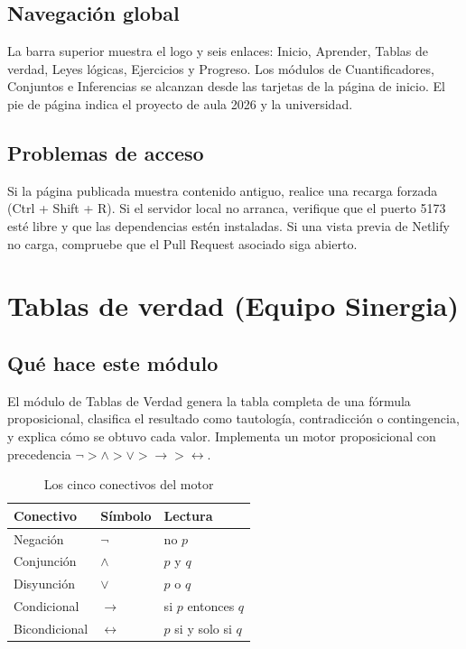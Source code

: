 \documentclass[11pt,a4paper,openany]{book}
\begin{document}
\section{Navegaci\'on global}
La barra superior muestra el logo y seis enlaces: Inicio, Aprender, Tablas de verdad, Leyes l\'ogicas, Ejercicios y Progreso. Los m\'odulos de Cuantificadores, Conjuntos e Inferencias se alcanzan desde las tarjetas de la p\'agina de inicio. El pie de p\'agina indica el proyecto de aula 2026 y la universidad.

\section{Problemas de acceso}
Si la p\'agina publicada muestra contenido antiguo, realice una recarga forzada (Ctrl + Shift + R). Si el servidor local no arranca, verifique que el puerto 5173 est\'e libre y que las dependencias est\'en instaladas. Si una vista previa de Netlify no carga, compruebe que el Pull Request asociado siga abierto.

\chapter{Tablas de verdad (Equipo Sinergia)}
\label{ch:tablas}
\section{Qu\'e hace este m\'odulo}
El m\'odulo de Tablas de Verdad genera la tabla completa de una f\'ormula proposicional, clasifica el resultado como tautolog\'ia, contradicci\'on o contingencia, y explica c\'omo se obtuvo cada valor. Implementa un motor proposicional con precedencia $\lnot > \land > \lor > \to > \leftrightarrow$.

\begin{table}[H]
\centering
\caption{Los cinco conectivos del motor}
\label{tab:conectivos}
\begin{tabular}{lll}
\toprule
Conectivo & S\'imbolo & Lectura \\
\midrule
Negaci\'on & $\lnot$ & no $p$ \\
Conjunci\'on & $\land$ & $p$ y $q$ \\
Disyunci\'on & $\lor$ & $p$ o $q$ \\
Condicional & $\to$ & si $p$ entonces $q$ \\
Bicondicional & $\leftrightarrow$ & $p$ si y solo si $q$ \\
\bottomrule
\end{tabular}
\end{table}
\end{document}
